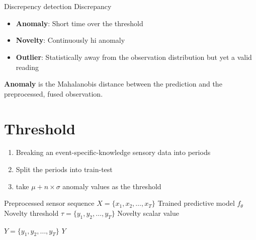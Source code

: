 \section{}
    \begin{frame}{Discrepency detection}
        Discrepancy
        \begin{itemize}
            \item \textbf{Anomaly}: Short time over the threshold
            \item \textbf{Novelty}: Continuously hi anomaly
            \item \textbf{Outlier}: Statistically away from the observation distribution but yet a valid reading
        \end{itemize}
        
        \textbf{Anomaly} is the Mahalanobis distance between the prediction and the preprocessed, fused observation.
        
        
        \section{Threshold}
            \begin{enumerate}
                \item Breaking an event-specific-knowledge sensory data into periods
                \item Split the periods into train-test
                \item take $\mu + n \times \sigma$ anomaly values as the threshold
            \end{enumerate}
            
            \begin{algorithm}[H]
		\caption{Novelty Detection from Sensor Sequences}
        \begin{algorithmic}[1]
			\Require Preprocessed sensor sequence $X = \{x_1, x_2, \dots, x_T\}$
            \Require Trained predictive model $f_{\theta}$
            \Ensure Novelty threshold $\tau = \{y_1, y_2, \dots, y_T\}$
            \Ensure Novelty scalar value
            
            
            $Y = \{y_1, y_2, \dots, y_T\}$
            \State \Return $Y$
        \end{algorithmic}
            \end{algorithm}
    \end{frame}
    
    \subsection{}
        